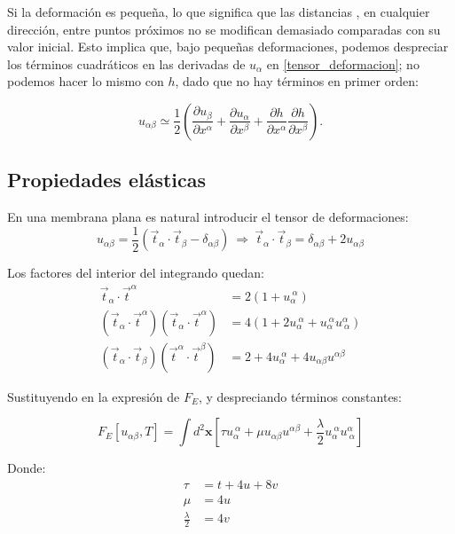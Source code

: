 Si la deformación es pequeña, lo que significa que las distancias
, en cualquier dirección, entre puntos próximos no se modifican demasiado comparadas con
su valor inicial. Esto implica que, bajo pequeñas deformaciones, podemos
despreciar los términos cuadráticos en las derivadas de $u_{\alpha}$ en
\eqref{tensor_deformacion}; no podemos hacer lo mismo con $h$, dado que no hay
términos en primer orden: 

\begin{equation}
u_{\alpha\beta}\simeq\frac{1}{2}\left(
 \frac{\partial u_{\beta}}{\partial x^{\alpha}}+
 \frac{\partial u_{\alpha}}{\partial x^{\beta}}+
\frac{\partial h}{\partial  x^{\alpha}}\frac{\partial h}{\partial x^{\beta}}\right).
\end{equation}

\subsection{Propiedades elásticas}

En una membrana plana es natural introducir el tensor de deformaciones:
\begin{equation*}
u_{\alpha\beta}=\frac{1}{2}(\vec{t}_{\alpha}\cdot\vec{t}_{\beta}-\delta_{\alpha\beta})\
\Rightarrow \
\vec{t}_{\alpha}\cdot\vec{t}_{\beta}=\delta_{\alpha\beta}+2u_{\alpha\beta}
\end{equation*}

Los factores del interior del integrando quedan:
\begin{align}
\vec{t}_{\alpha}\cdot\vec{t}^{\alpha} &=2(1+u_{\alpha}^{\ \alpha})\\
(\vec{t}_{\alpha}\cdot\vec{t}^{\alpha})(\vec{t}_{\alpha}\cdot\vec{t}^{\alpha})&=4(1+2u_{\alpha}^{\
  \alpha}+u_{\alpha}^{\ \alpha}u^{\alpha}_{\ \alpha})\\
(\vec{t}_{\alpha}\cdot\vec{t}_{\beta})(\vec{t}^{\alpha}\cdot\vec{t}^{\beta})&=2+4u_{\alpha}^{\
  \alpha}+4u_{\alpha\beta}u^{\alpha\beta}
\end{align}

Sustituyendo en la expresión de $F_E$, y despreciando términos constantes:

\begin{equation}\label{Elibre_elastica}
F_E[u_{\alpha\beta},T]=\int d^2\mathbf{x}
\left[\tau u_{\alpha}^{\ \alpha}+
\mu u_{\alpha\beta}u^{\alpha\beta} +
\frac{\lambda}{2}u_{\alpha}^{\ \alpha}u^{\alpha}_{\ \alpha}\right]
\end{equation}

Donde:
\begin{align}
\tau&=t+4u+8v\label{tau}\\
\mu&=4u\\
\frac{\lambda}{2}&=4v
\end{align}

